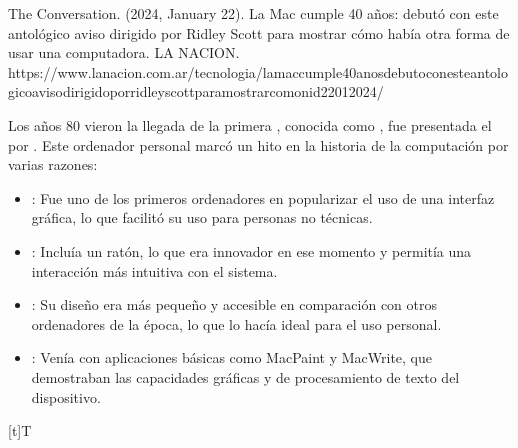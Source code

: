\documentclass[letterpaper,10pt,spanish]{sphinxmanual}
\let\sphinxpxdimen\pdfpxdimen\else\newdimen\sphinxpxdimen
\begin{document}
\sphinxAtStartPar
%
\begin{footnote}[7]\sphinxAtStartFootnote
The Conversation. (2024, January 22). La Mac cumple 40 años: debutó con este antológico aviso dirigido por Ridley Scott para mostrar cómo había otra forma de usar una computadora. LA NACION. https://www.lanacion.com.ar/tecnologia/la\sphinxhyphen{}mac\sphinxhyphen{}cumple\sphinxhyphen{}40\sphinxhyphen{}anos\sphinxhyphen{}debuto\sphinxhyphen{}con\sphinxhyphen{}este\sphinxhyphen{}antologico\sphinxhyphen{}aviso\sphinxhyphen{}dirigido\sphinxhyphen{}por\sphinxhyphen{}ridley\sphinxhyphen{}scott\sphinxhyphen{}para\sphinxhyphen{}mostrar\sphinxhyphen{}como\sphinxhyphen{}nid22012024/
%
\end{footnote} Los años 80 vieron la llegada de la primera , conocida como , fue presentada el  por . Este ordenador personal marcó un hito en la historia de la computación por varias razones:
\begin{itemize}
\item {} 
\sphinxAtStartPar
{}: Fue uno de los primeros ordenadores en popularizar el uso de una interfaz gráfica, lo que facilitó su uso para personas no técnicas.

\item {} 
\sphinxAtStartPar
{}: Incluía un ratón, lo que era innovador en ese momento y permitía una interacción más intuitiva con el sistema.

\item {} 
\sphinxAtStartPar
{}: Su diseño era más pequeño y accesible en comparación con otros ordenadores de la época, lo que lo hacía ideal para el uso personal.

\item {} 
\sphinxAtStartPar
{}: Venía con aplicaciones básicas como MacPaint y MacWrite, que demostraban las capacidades gráficas y de procesamiento de texto del dispositivo.

\end{itemize}


\begin{savenotes}\sphinxattablestart
\sphinxthistablewithglobalstyle
\centering
\begin{tabulary}{\linewidth}[t]{T}
\sphinxtoprule
\sphinxtableatstartofbodyhook

\begin{sphinxfigure-in-table}
\centering
\capstart
\noindent\sphinxincludegraphics[width=600\sphinxpxdimen]{{image05}.png}
\label{\detokenize{1_guias/10informatica/G1001:id30}}\end{sphinxfigure-in-table}\relax
\\
\sphinxbottomrule
\end{tabulary}
\sphinxtableafterendhook\par
\sphinxattableend\end{savenotes}
\end{document}
